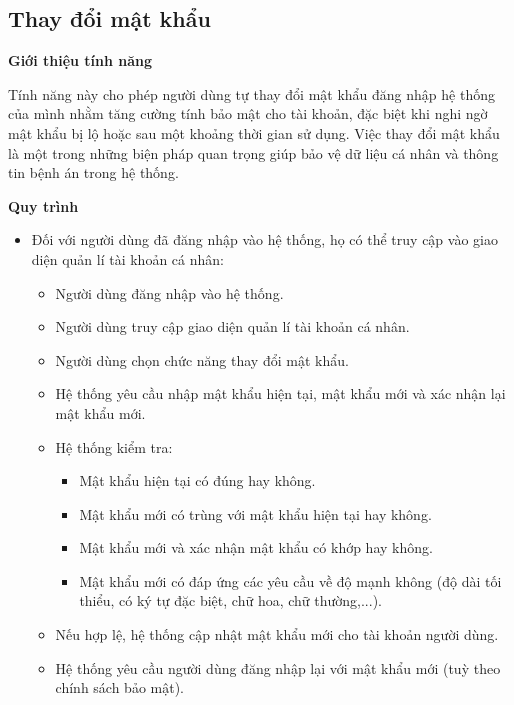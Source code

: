 \subsection{Thay đổi mật khẩu}

\noindent \textbf{Giới thiệu tính năng}

Tính năng này cho phép người dùng tự thay đổi mật khẩu đăng nhập hệ thống của mình nhằm tăng cường tính bảo mật cho tài khoản, đặc biệt khi nghi ngờ mật khẩu bị lộ hoặc sau một khoảng thời gian sử dụng. Việc thay đổi mật khẩu là một trong những biện pháp quan trọng giúp bảo vệ dữ liệu cá nhân và thông tin bệnh án trong hệ thống.

\noindent \textbf{Quy trình}

\begin{itemize}    
    \item Đối với người dùng đã đăng nhập vào hệ thống, họ có thể truy cập vào giao diện quản lí tài khoản cá nhân:
    \begin{itemize}

    \item Người dùng đăng nhập vào hệ thống.

    \item Người dùng truy cập giao diện quản lí tài khoản cá nhân.

    \item Người dùng chọn chức năng thay đổi mật khẩu.

    \item Hệ thống yêu cầu nhập mật khẩu hiện tại, mật khẩu mới và xác nhận lại mật khẩu mới.

    \item Hệ thống kiểm tra:

    \begin{itemize}
        \item Mật khẩu hiện tại có đúng hay không.
        \item Mật khẩu mới có trùng với mật khẩu hiện tại hay không.
        \item Mật khẩu mới và xác nhận mật khẩu có khớp hay không.
        \item Mật khẩu mới có đáp ứng các yêu cầu về độ mạnh không (độ dài tối thiểu, có ký tự đặc biệt, chữ hoa, chữ thường,...).
    \end{itemize}

    \item Nếu hợp lệ, hệ thống cập nhật mật khẩu mới cho tài khoản người dùng.

    \item Hệ thống yêu cầu người dùng đăng nhập lại với mật khẩu mới (tuỳ theo chính sách bảo mật).


\end{itemize}
\end{itemize}
